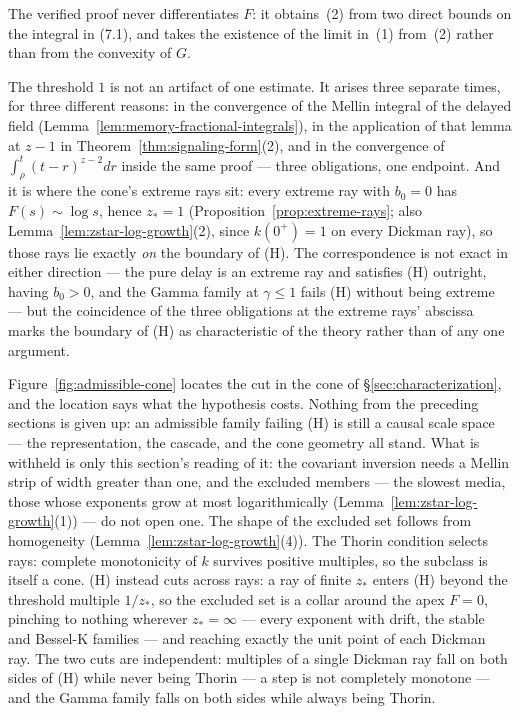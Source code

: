 The verified proof never differentiates $F$: it obtains~(2) from two direct bounds on the
integral in (7.1), and takes the existence of the limit in~(1) from~(2) rather than from the
convexity of $G$.

The threshold $1$ is not an artifact of one estimate. It arises three separate times, for
three different reasons: in the convergence of the Mellin integral of the delayed field
(Lemma~\ref{lem:memory-fractional-integrals}), in the application of that lemma at $z - 1$
in Theorem~\ref{thm:signaling-form}(2), and in the convergence of $\int_\rho^t (t-r)^{z-2}dr$
inside the same proof --- three obligations, one endpoint. And it is where the cone's extreme
rays sit: every extreme ray with $b_0 = 0$ has $F(s) \sim \log s$, hence $z_* = 1$
(Proposition~\ref{prop:extreme-rays}; also Lemma~\ref{lem:zstar-log-growth}(2), since
$k(0^+) = 1$ on every Dickman ray), so those rays lie exactly \emph{on} the boundary of
(H). The correspondence is not exact in either direction --- the pure delay is an extreme ray
and satisfies (H) outright, having $b_0 > 0$, and the Gamma family at $\gamma \le 1$ fails
(H) without being extreme --- but the coincidence of the three obligations at the extreme
rays' abscissa marks the boundary of (H) as characteristic of the theory rather than of any
one argument.

Figure~\ref{fig:admissible-cone} locates the cut in the cone of \S\ref{sec:characterization},
and the location says what the hypothesis costs. Nothing from the preceding sections is given
up: an admissible family failing (H) is still a causal scale space --- the representation, the
cascade, and the cone geometry all stand. What is withheld is only this section's
reading of it: the covariant inversion needs a Mellin strip of width greater than one, and the
excluded members --- the slowest media, those whose exponents grow at most logarithmically
(Lemma~\ref{lem:zstar-log-growth}(1)) --- do not open one. The shape of the excluded set
follows from homogeneity (Lemma~\ref{lem:zstar-log-growth}(4)). The Thorin condition selects
rays: complete monotonicity of $k$ survives positive multiples, so the subclass is itself a
cone. (H) instead cuts across rays: a ray of finite $z_*$ enters (H) beyond the threshold
multiple $1/z_*$, so the excluded set is a collar around the apex $F = 0$, pinching to nothing
wherever $z_* = \infty$ --- every exponent with drift, the stable and Bessel-K families ---
and reaching exactly the unit point of each Dickman ray. The two cuts are independent:
multiples of a single Dickman ray fall on both sides of (H) while never being Thorin --- a
step is not completely monotone --- and the Gamma family falls on both sides while always
being Thorin.

